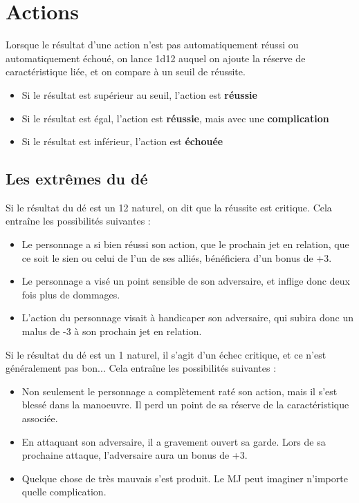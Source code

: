 \documentclass[a4paper,10pt,twoside,twocolumn,openany,bg=print,justified]{dndbook}
\begin{document}
\section{Actions}

Lorsque le résultat d'une action n'est pas automatiquement réussi ou automatiquement échoué, on lance 1d12 auquel on ajoute la réserve de caractéristique liée, et on compare à un seuil de réussite. 

\begin{itemize}
	\item Si le résultat est supérieur au seuil, l'action est \textbf{réussie}
	\item Si le résultat est égal, l'action est \textbf{réussie}, mais avec une \textbf{complication}
	\item Si le résultat est inférieur, l'action est \textbf{échouée}
\end{itemize}

\subsection*{Les extrêmes du dé}

Si le résultat du dé est un 12 naturel, on dit que la réussite est critique. Cela entraîne les possibilités suivantes :

\begin{itemize}
	\item Le personnage a si bien réussi son action, que le prochain jet en relation, que ce soit le sien ou celui de l'un de ses alliés, bénéficiera d'un bonus de +3.
	\item Le personnage a visé un point sensible de son adversaire, et inflige donc deux fois plus de dommages.
	\item L'action du personnage visait à handicaper son adversaire, qui subira donc un malus de -3 à son prochain jet en relation.
\end{itemize}

Si le résultat du dé est un 1 naturel, il s'agit d'un échec critique, et ce n'est généralement pas bon... Cela entraîne les possibilités suivantes :

\begin{itemize}
	\item Non seulement le personnage a complètement raté son action, mais il s'est blessé dans la manoeuvre. Il perd un point de sa réserve de la caractéristique associée.
	\item En attaquant son adversaire, il a gravement ouvert sa garde. Lors de sa prochaine attaque, l'adversaire aura un bonus de +3.
	\item Quelque chose de très mauvais s'est produit. Le MJ peut imaginer n'importe quelle complication.
\end{itemize}
\end{document}
